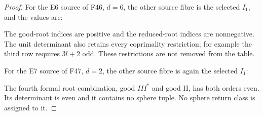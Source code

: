 \begin{proof}
For the E6 source of F46, \(d=6\), the other source fibre is
the selected \(I_1\), and the values are:

\par{}\par\medskip

The good-root indices are positive and the reduced-root indices
are nonnegative. The unit determinant also retains every
coprimality restriction; for example the third row requires
\(3l+2\) odd. These restrictions are not removed from the table.

For the E7 source of F47, \(d=2\), the other source fibre is again
the selected \(I_1\):

\par{}\par\medskip

The fourth formal root combination, good \(III^*\) and good II,
has both orders even. Its determinant is even and it contains
no sphere tuple. No sphere return class is assigned to it.


\end{proof}
